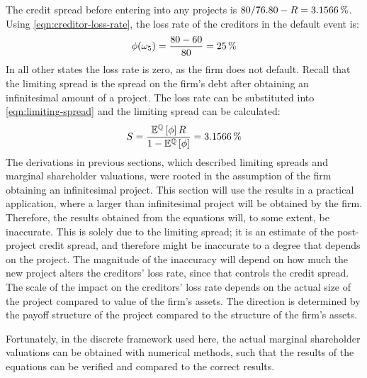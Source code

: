 \documentclass[main.tex]{subfiles}
\begin{document}
    The credit spread before entering into any projects is 
    $\num{80}/\num{76.80} - \grossrfrate = \pct{0.031566}$.
    Using \cref{eqn:creditor-loss-rate}, the loss rate of the creditors in the default event is:
        \begin{equation*}
            \phi(\omega_{5}) 
            = 
                \frac{
                    \num{80}-\num{60}
                }{
                    \num{80}
                } 
            = 
                \pct{0.25}
        \end{equation*}
    In all other states the loss rate is zero, as the firm does not default.
    Recall that the limiting spread is the spread on the firm's debt 
    after obtaining an infinitesimal amount of a project. 
    The loss rate can be substituted into \cref{eqn:limiting-spread} 
    and the limiting spread can be calculated:
        \begin{equation*}
            S
            =
            \frac{
                \mathbb{E}^{\rnmeasure}\left[\phi\right]
                R
            }{
                1 
                -
                \mathbb{E}^{\rnmeasure}\left[\phi\right] 
            } 
            =
            \pct{0.031566}
        \end{equation*}
    \indent
    The derivations in previous sections, 
    which described limiting spreads and marginal shareholder valuations, 
    were rooted in the assumption of the firm obtaining an infinitesimal project.
    This section will use the results in a practical application,
    where a larger than infinitesimal project will be obtained by the firm.
    Therefore, the results obtained from the equations will, to some extent, be inaccurate.
    This is solely due to the limiting spread;
    it is an estimate of the post-project credit spread,
    and therefore might be inaccurate to a degree that depends on the project.
    The magnitude of the inaccuracy will depend on how much the new project alters
    the creditors' loss rate, since that controls the credit spread.
    The scale of the impact on the creditors' loss rate 
    depends on the actual size of the project compared to value of the firm's assets.
    The direction is determined by the payoff structure of the project
    compared to the structure of the firm's assets.

    Fortunately, in the discrete framework used here, 
    the actual marginal shareholder valuations can be obtained with numerical methods,
    such that the results of the equations can be verified and compared to the correct results.
\end{document}
